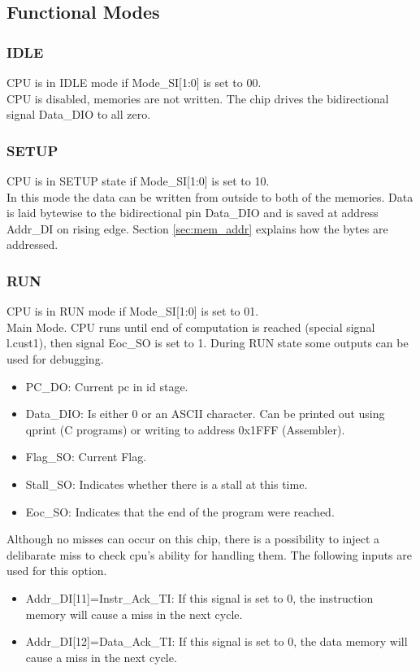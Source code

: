 \subsection{Functional Modes}
\subsubsection{IDLE}
CPU is in IDLE mode if Mode\_SI[1:0] is set to 00.\\
CPU is disabled, memories are not written. The chip drives the bidirectional signal Data\_DIO to all zero.
\subsubsection{SETUP}  
CPU is in SETUP state if Mode\_SI[1:0] is set to 10.\\
In this mode the data can be written from outside to both of the memories. Data is laid bytewise to the bidirectional pin Data\_DIO and is saved at address Addr\_DI on rising edge.  Section \ref{sec:mem_addr} explains how the bytes are addressed.
\subsubsection{RUN}
CPU is in RUN mode if Mode\_SI[1:0] is set to 01.\\
Main Mode. CPU runs until end of computation is reached (special signal l.cust1), then signal Eoc\_SO is set to 1. During RUN state some outputs can be used for debugging.
\begin{itemize}
\item PC\_DO: Current \gls{pc} in \gls{id} stage.
\item Data\_DIO: Is either 0 or an ASCII character. Can be printed out using qprint (C programs) or writing to address 0x1FFF (Assembler).
\item Flag\_SO: Current Flag.
\item Stall\_SO: Indicates whether there is a stall at this time. 
\item Eoc\_SO: Indicates that the end of the program were reached.
\end{itemize}

Although no misses can occur on this chip, there is a possibility to inject a delibarate miss to check cpu's ability for handling them. The following inputs are used for this option.
\begin {itemize}
\item Addr\_DI[11]=Instr\_Ack\_TI: If this signal is set to 0, the instruction memory will cause a miss in the next cycle.
\item Addr\_DI[12]=Data\_Ack\_TI: If this signal is set to 0, the data memory will cause a miss in the next cycle.
\end{itemize}

